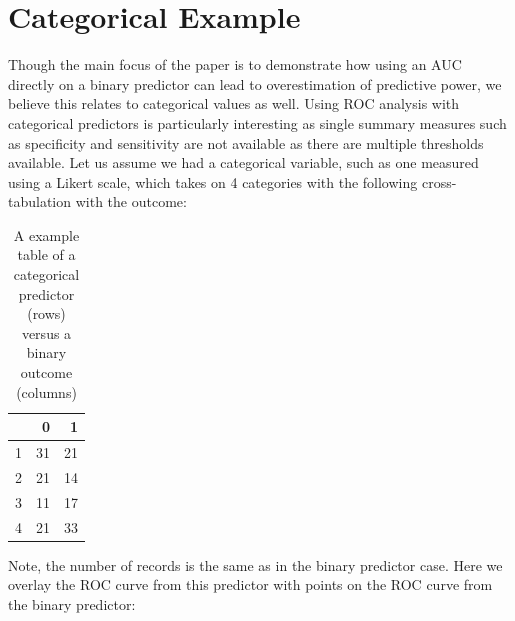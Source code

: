 \documentclass[article]{jss}
\begin{document}
\hypertarget{categorical-example}{%
\section{Categorical Example}\label{categorical-example}}

Though the main focus of the paper is to demonstrate how using an AUC
directly on a binary predictor can lead to overestimation of predictive
power, we believe this relates to categorical values as well. Using ROC
analysis with categorical predictors is particularly interesting as
single summary measures such as specificity and sensitivity are not
available as there are multiple thresholds available. Let us assume we
had a categorical variable, such as one measured using a Likert scale,
which takes on 4 categories with the following cross-tabulation with the
outcome:

\begin{CodeChunk}
\begin{table}[ht]

\caption{\label{tab:create_cat_tab_output}A example table of a categorical predictor (rows) versus a binary outcome (columns)}
\centering
\begin{tabular}{l|r|r}
\hline
  & 0 & 1\\
\hline
1 & 31 & 21\\
\hline
2 & 21 & 14\\
\hline
3 & 11 & 17\\
\hline
4 & 21 & 33\\
\hline
\end{tabular}
\end{table}

\end{CodeChunk}

Note, the number of records is the same as in the binary predictor case.
Here we overlay the ROC curve from this predictor with points on the ROC
curve from the binary predictor:
\end{document}
